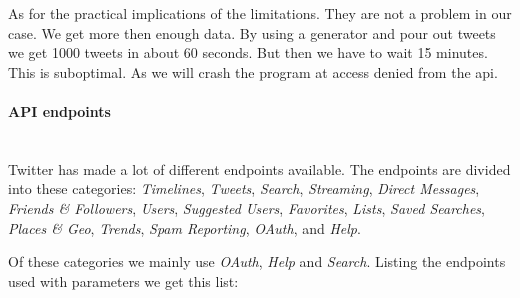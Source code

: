 As for the practical implications  of the limitations. They are not a problem in
our case. We get more then enough data. By using a generator and pour out tweets
we get 1000 tweets in about 60 seconds. But then we have to wait 15 minutes.
This is suboptimal. As we will crash the program at access denied from the api.  
%

\paragraph{API endpoints}\label{data:twitter:endpoints}
\hspace{0pt}\\
Twitter has made a lot of different endpoints available. The endpoints are
divided into these categories: \textit{Timelines}, \textit{Tweets},
\textit{Search}, \textit{Streaming}, \textit{Direct Messages}, \textit{Friends
\& Followers}, \textit{Users}, \textit{Suggested Users}, \textit{Favorites},
\textit{Lists}, \textit{Saved Searches}, \textit{Places \& Geo},
\textit{Trends}, \textit{Spam Reporting}, \textit{OAuth}, and \textit{Help}.

Of these categories we mainly use \textit{OAuth}, \textit{Help} and
\textit{Search}.
Listing the endpoints used with parameters we get this list: 


